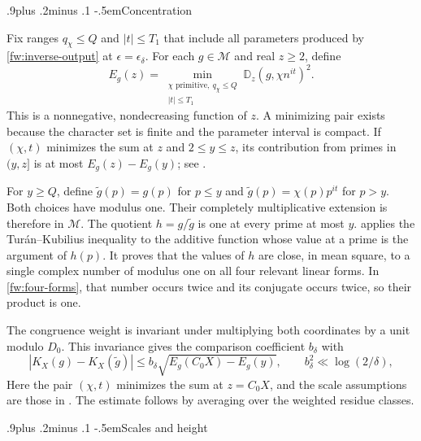 \documentclass[twoside]{aomart}
\makeatletter
\theoremstyle{paperplain}
\theoremstyle{paperdefinition}
\renewcommand\subsection{\@startsection{subsection}{2}{\z@}
  {.9\baselineskip plus .2\baselineskip minus .1\baselineskip}
  {-.5em}{\normalfont\bfseries}}
\numberwithin{equation}{section}
\makeatother
\begin{document}
\subsection{Concentration}

Fix ranges $q_\chi\le Q$ and $|t|\le T_1$ that include all
parameters produced by \eqref{fw:inverse-output} at
$\epsilon=\epsilon_\delta$. For each $g\in\mathcal M$ and real
$z\ge2$, define
\begin{equation*}
 E_g(z)=\min_{\substack{\chi\text{ primitive},\ q_\chi\le Q\\|t|\le T_1}}
       \mathbb D_z(g,\chi n^{it})^2.
\end{equation*}
This is a nonnegative, nondecreasing function of $z$. A minimizing
pair exists because the character set is finite and the parameter
interval is compact. If $(\chi,t)$ minimizes the sum at $z$ and
$2\le y\le z$, its contribution from primes in $(y,z]$ is at most
$E_g(z)-E_g(y)$; see .

For $y\ge Q$, define $\widetilde g(p)=g(p)$ for $p\le y$ and
$\widetilde g(p)=\chi(p)p^{it}$ for $p>y$. Both choices have modulus
one. Their completely multiplicative extension is therefore in
$\mathcal M$. The quotient $h=g/\widetilde g$ is one at every
prime at most $y$.
 applies the Tur\'an--Kubilius inequality to
the additive function whose value at a prime is the argument of
$h(p)$. It proves that the values of $h$ are close, in mean square,
to a single complex number of modulus one on all four relevant
linear forms. In \eqref{fw:four-forms}, that number occurs twice
and its conjugate occurs twice, so their product is one.

The congruence weight is invariant under multiplying both
coordinates by a unit modulo $D_0$. This invariance gives the
comparison coefficient $b_\delta$ with
\begin{equation}
 |K_X(g)-K_X(\widetilde g)|
 \le b_\delta\sqrt{E_g(C_0X)-E_g(y)},
 \qquad b_\delta^2\ll\log(2/\delta),
 \label{fw:concentration}
\end{equation}
Here the pair $(\chi,t)$ minimizes the sum at $z=C_0X$,
and the scale assumptions are those in .
The estimate follows by averaging over the weighted residue classes.

\subsection{Scales and height}
\end{document}
